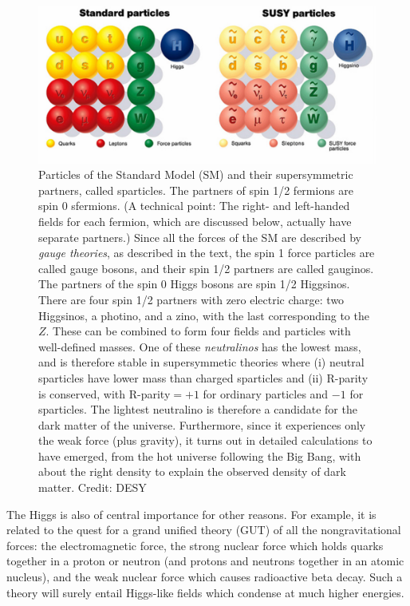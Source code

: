 \documentclass[12pt]{iopart}
\begin{document}
\begin{figure}[htbp]
\centering
 \includegraphics[bb=0 0 360 165, width=5in]{Fig9-susyparticles_sm.eps}
 \caption{Particles of the Standard Model (SM) and their supersymmetric partners, called sparticles. The partners of spin 1/2 fermions are spin 0 sfermions. (A technical point: The right- and left-handed fields for each fermion, which are discussed below, actually have separate partners.) Since all the forces of the SM are described by \textit{gauge theories}, as described in the text, the spin 1 force particles are called gauge bosons, and their spin 1/2 partners are called gauginos. The partners of the spin 0 Higgs bosons are spin 1/2 Higgsinos. 
\newline \indent
There are four spin 1/2 partners with zero electric charge: two Higgsinos, a photino, and a zino, with the last corresponding to the $Z$. These can be combined to form four fields and particles with well-defined masses. One of these \textit{neutralinos} has the lowest mass, and is therefore stable in supersymmetic theories where (i) neutral sparticles have lower mass than charged sparticles and (ii) R-parity is conserved, with R-parity$=+1$ for ordinary particles and $-1$ for sparticles. 
\newline \indent
The lightest neutralino is therefore a candidate for the dark matter of the universe. Furthermore, since it experiences only the weak force (plus gravity), it turns out in detailed calculations to have emerged, from the hot universe following the Big Bang, with about the right density to explain the observed density of dark matter. Credit: DESY \label{Fig9-susyparticles_sm.eps}}
 \end{figure}

The Higgs is also of central importance for other reasons. For example, it is related to the quest for a grand unified theory (GUT) of all the nongravitational forces:  the electromagnetic force, the strong nuclear force which holds quarks together in a proton or neutron (and protons and neutrons together in an atomic nucleus), and the weak nuclear force which causes radioactive beta decay. Such a theory will surely entail Higgs-like fields which condense at much higher energies. 
\end{document}
